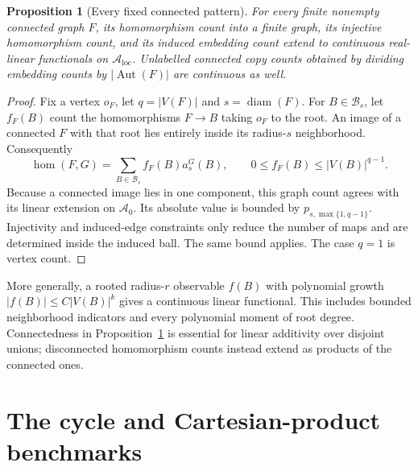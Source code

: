 \documentclass[11pt]{article}
\newtheorem{proposition}[theorem]{Proposition}
\theoremstyle{definition}\newtheorem{definition}[theorem]{Definition}
\newcommand{\A}{\mathcal A}
\newcommand{\B}{\mathcal B}
\newcommand{\homc}{\operatorname{hom}}
\DeclareMathOperator{\diam}{diam}
\begin{document}
\begin{proposition}[Every fixed connected pattern]\label{prop:motifs}
For every finite nonempty connected graph $F$, its homomorphism count into a finite graph, its injective homomorphism count, and its induced embedding count extend to continuous real-linear functionals on $\A_{\mathrm{loc}}$. Unlabelled connected copy counts obtained by dividing embedding counts by $|\operatorname{Aut}(F)|$ are continuous as well.
\end{proposition}
\begin{proof}
Fix a vertex $o_F$, let $q=|V(F)|$ and $s=\diam(F)$. For $B\in\B_s$, let $f_F(B)$ count the homomorphisms $F\to B$ taking $o_F$ to the root. An image of a connected $F$ with that root lies entirely inside its radius-$s$ neighborhood. Consequently
\[
 \homc(F,G)=\sum_{B\in\B_s}f_F(B)a_s^G(B),\qquad
 0\le f_F(B)\le |V(B)|^{q-1}.
\]
Because a connected image lies in one component, this graph count agrees with its linear extension on $\A_0$. Its absolute value is bounded by $p_{s,\max\{1,q-1\}}$. Injectivity and induced-edge constraints only reduce the number of maps and are determined inside the induced ball. The same bound applies. The case $q=1$ is vertex count.
\end{proof}

More generally, a rooted radius-$r$ observable $f(B)$ with polynomial growth $|f(B)|\le C|V(B)|^k$ gives a continuous linear functional. This includes bounded neighborhood indicators and every polynomial moment of root degree. Connectedness in Proposition~\ref{prop:motifs} is essential for linear additivity over disjoint unions; disconnected homomorphism counts instead extend as products of the connected ones.

\section{The cycle and Cartesian-product benchmarks}
\end{document}
